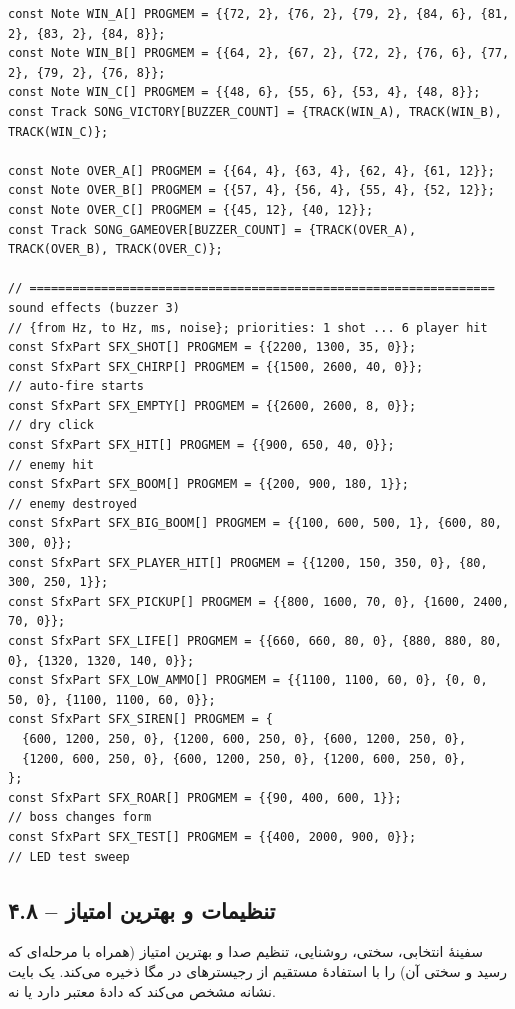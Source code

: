 \documentclass[11pt,a4paper]{article}
\begin{document}
\begin{latin}
\begin{lstlisting}[language=Arduino]
const Note WIN_A[] PROGMEM = {{72, 2}, {76, 2}, {79, 2}, {84, 6}, {81, 2}, {83, 2}, {84, 8}};
const Note WIN_B[] PROGMEM = {{64, 2}, {67, 2}, {72, 2}, {76, 6}, {77, 2}, {79, 2}, {76, 8}};
const Note WIN_C[] PROGMEM = {{48, 6}, {55, 6}, {53, 4}, {48, 8}};
const Track SONG_VICTORY[BUZZER_COUNT] = {TRACK(WIN_A), TRACK(WIN_B), TRACK(WIN_C)};

const Note OVER_A[] PROGMEM = {{64, 4}, {63, 4}, {62, 4}, {61, 12}};
const Note OVER_B[] PROGMEM = {{57, 4}, {56, 4}, {55, 4}, {52, 12}};
const Note OVER_C[] PROGMEM = {{45, 12}, {40, 12}};
const Track SONG_GAMEOVER[BUZZER_COUNT] = {TRACK(OVER_A), TRACK(OVER_B), TRACK(OVER_C)};

// ================================================================= sound effects (buzzer 3)
// {from Hz, to Hz, ms, noise}; priorities: 1 shot ... 6 player hit
const SfxPart SFX_SHOT[] PROGMEM = {{2200, 1300, 35, 0}};
const SfxPart SFX_CHIRP[] PROGMEM = {{1500, 2600, 40, 0}};                  // auto-fire starts
const SfxPart SFX_EMPTY[] PROGMEM = {{2600, 2600, 8, 0}};                   // dry click
const SfxPart SFX_HIT[] PROGMEM = {{900, 650, 40, 0}};                      // enemy hit
const SfxPart SFX_BOOM[] PROGMEM = {{200, 900, 180, 1}};                    // enemy destroyed
const SfxPart SFX_BIG_BOOM[] PROGMEM = {{100, 600, 500, 1}, {600, 80, 300, 0}};
const SfxPart SFX_PLAYER_HIT[] PROGMEM = {{1200, 150, 350, 0}, {80, 300, 250, 1}};
const SfxPart SFX_PICKUP[] PROGMEM = {{800, 1600, 70, 0}, {1600, 2400, 70, 0}};
const SfxPart SFX_LIFE[] PROGMEM = {{660, 660, 80, 0}, {880, 880, 80, 0}, {1320, 1320, 140, 0}};
const SfxPart SFX_LOW_AMMO[] PROGMEM = {{1100, 1100, 60, 0}, {0, 0, 50, 0}, {1100, 1100, 60, 0}};
const SfxPart SFX_SIREN[] PROGMEM = {
  {600, 1200, 250, 0}, {1200, 600, 250, 0}, {600, 1200, 250, 0},
  {1200, 600, 250, 0}, {600, 1200, 250, 0}, {1200, 600, 250, 0},
};
const SfxPart SFX_ROAR[] PROGMEM = {{90, 400, 600, 1}};                     // boss changes form
const SfxPart SFX_TEST[] PROGMEM = {{400, 2000, 900, 0}};                   // LED test sweep
\end{lstlisting}

\end{latin}

\clearpage
\subsection*{۴.۸  –  تنظیمات و بهترین امتیاز}
سفینهٔ انتخابی، سختی، روشنایی، تنظیم صدا و بهترین امتیاز (همراه با مرحله‌ای که رسید و سختی آن) را با استفادهٔ مستقیم از رجیسترهای  در  مگا ذخیره می‌کند. یک بایت نشانه مشخص می‌کند که  دادهٔ معتبر دارد یا نه.
\end{document}

